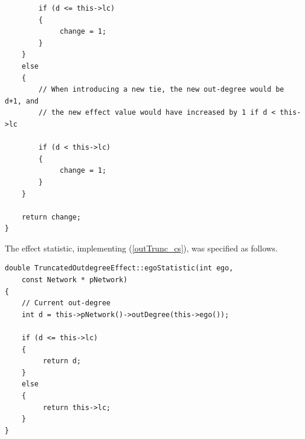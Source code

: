 \documentclass[a4paper,fleqn,11pt]{article}
\newcommand{\+}{\, + \,}
\begin{document}
\begin{enumerate}
{\begin{verbatim}
        if (d <= this->lc)
        {
             change = 1;
        }
    }
    else
    {
        // When introducing a new tie, the new out-degree would be d+1, and
        // the new effect value would have increased by 1 if d < this->lc

        if (d < this->lc)
        {
             change = 1;
        }
    }

    return change;
}
\end{verbatim}
}

      The effect statistic, implementing (\ref{outTrunc_cs}),
      was specified as follows.

{\small
\begin{verbatim}
double TruncatedOutdegreeEffect::egoStatistic(int ego,
    const Network * pNetwork)
{
    // Current out-degree
    int d =	this->pNetwork()->outDegree(this->ego());

    if (d <= this->lc)
    {
         return d;
    }
    else
    {
         return this->lc;
    }
}
\end{verbatim}
}


\end{enumerate}
\end{document}

